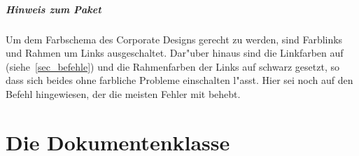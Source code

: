 \documentclass[twoside,colorback,accentcolor=tud4c,11pt]{tudreport}
\begin{document}
  \paragraph{Hinweis zum Paket \texorpdfstring{}{hyperref}}
    Um dem Farbschema des Corporate Designs gerecht zu werden, sind Farblinks und Rahmen um Links
    ausgeschaltet. Dar"uber hinaus sind die Linkfarben auf 
    (siehe~\ref{sec_befehle}) und die Rahmenfarben der Links auf schwarz gesetzt, so dass sich beides ohne
    farbliche Probleme einschalten l"asst. Hier sei noch auf den Befehl  hingewiesen, der die meisten Fehler mit
     behebt.

\chapter{Die Dokumentenklasse \texorpdfstring{}{tudreport}}\label{chap:tudreport}
\end{document}

